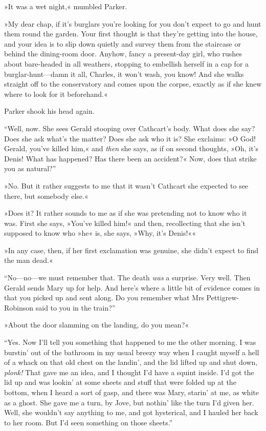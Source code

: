 »It was a wet night,« mumbled Parker.

»My dear chap, if it's burglars you're looking for you don't expect to go and hunt them round the garden. Your first thought is that they're getting into the house, and your idea is to slip down quietly and survey them from the staircase or behind the dining-room door. Anyhow, fancy a present-day girl, who rushes about bare-headed in all weathers, stopping to embellish herself in a cap for a burglar-hunt—damn it all, Charles, it won't wash, you know! And she walks straight off to the conservatory and comes upon the corpse, exactly as if she knew where to look for it beforehand.«

Parker shook his head again.

\enquote{Well, now. She sees Gerald stooping over Cathcart's body. What does she say? Does she ask what's the matter? Does she ask who it is? She exclaims: »O God! Gerald, you've killed him,« and \textit{then} she says, as if on second thoughts, »Oh, it's Denis! What has happened? Has there been an accident?« Now, does that strike you as natural?}

»No. But it rather suggests to me that it wasn't Cathcart she expected to see there, but somebody else.«

»Does it? It rather sounds to me as if she was pretending not to know who it was. First she says, »You've killed him!« and then, recollecting that she isn't supposed to know who »he« is, she says, »Why, it's Denis!««

»In any case, then, if her first exclamation was genuine, she didn't expect to find the man dead.«

\enquote{No—no—we must remember that. The death \textit{was} a surprise. Very well.  Then Gerald sends Mary up for help. And here's where a little bit of evidence comes in that you picked up and sent along. Do you remember what Mrs Pettigrew-Robinson said to you in the train?}

»About the door slamming on the landing, do you mean?«

\enquote{Yes. Now I'll tell you something that happened to me the other morning. I was burstin' out of the bathroom in my usual breezy way when I caught myself a hell of a whack on that old chest on the landin', and the lid lifted up and shut down, \textit{plonk!} That gave me an idea, and I thought I'd have a squint inside. I'd got the lid up and was lookin' at some sheets and stuff that were folded up at the bottom, when I heard a sort of gasp, and there was Mary, starin' at me, as white as a ghost.  She gave me a turn, by Jove, but nothin' like the turn I'd given her.  Well, she wouldn't say anything to me, and got hysterical, and I hauled her back to her room. But I'd seen something on those sheets.}

